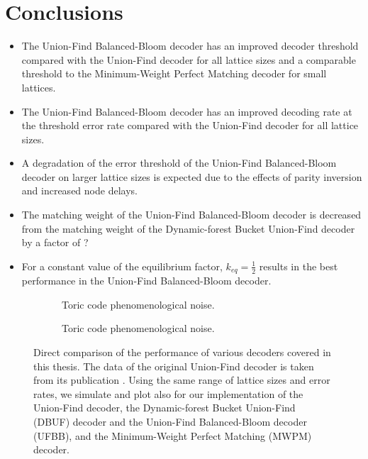 \chapter{Conclusions}


\begin{itemize}
  \item The Union-Find Balanced-Bloom decoder has an improved decoder threshold compared with the Union-Find decoder for all lattice sizes and a comparable threshold to the Minimum-Weight Perfect Matching decoder for small lattices.
  \item The Union-Find Balanced-Bloom decoder has an improved decoding rate at the threshold error rate compared with the Union-Find decoder for all lattice sizes. 
  \item A degradation of the error threshold of the Union-Find Balanced-Bloom decoder on larger lattice sizes is expected due to the effects of parity inversion and increased node delays. 
  \item The matching weight of the Union-Find Balanced-Bloom decoder is decreased from the matching weight of the Dynamic-forest Bucket Union-Find decoder by a factor of ?
  \item For a constant value of the equilibrium factor, $k_{eq}=\frac{1}{2}$ results in the best performance in the Union-Find Balanced-Bloom decoder.  
\end{itemize}


\begin{figure}[htbp]
  \begin{subfigure}[b]{\textwidth}
    \begin{adjustbox}{Clip=0 1em 0 0}
      
    \end{adjustbox}
    \caption{Toric code phenomenological noise.}
  \end{subfigure}
  \begin{subfigure}[b]{\textwidth}
    \begin{adjustbox}{Clip=0 1em 0 0}
      
    \end{adjustbox}
    \caption{Toric code phenomenological noise.}
  \end{subfigure}
  \caption{Direct comparison of the performance of various decoders covered in this thesis. The data of the original Union-Find decoder is taken from its publication \cite{delfosse2017almost}. Using the same range of lattice sizes and error rates, we simulate and plot also for our implementation of the Union-Find decoder, the Dynamic-forest Bucket Union-Find (DBUF) decoder and the Union-Find Balanced-Bloom decoder (UFBB), and the Minimum-Weight Perfect Matching (MWPM) decoder.}
\end{figure}